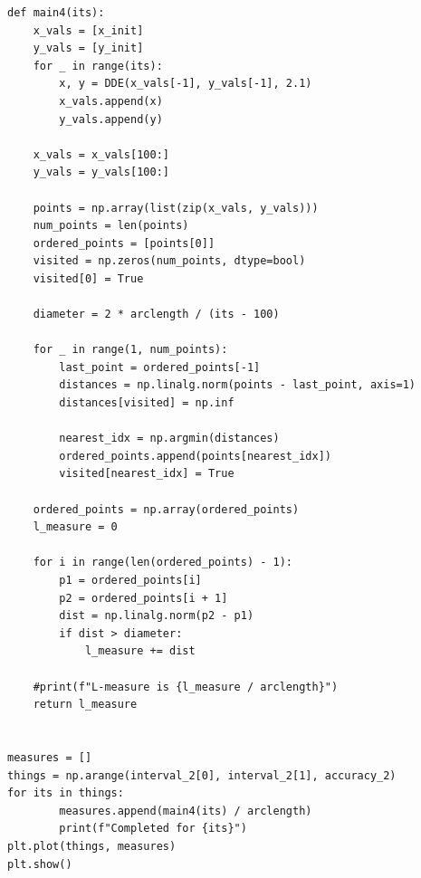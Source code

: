 \documentclass[11pt, letterpaper]{article}
\begin{document}
\begin{lstlisting}
def main4(its):
    x_vals = [x_init]
    y_vals = [y_init]
    for _ in range(its):
        x, y = DDE(x_vals[-1], y_vals[-1], 2.1)
        x_vals.append(x)
        y_vals.append(y)

    x_vals = x_vals[100:]
    y_vals = y_vals[100:]

    points = np.array(list(zip(x_vals, y_vals)))
    num_points = len(points)
    ordered_points = [points[0]]
    visited = np.zeros(num_points, dtype=bool)
    visited[0] = True

    diameter = 2 * arclength / (its - 100)

    for _ in range(1, num_points):
        last_point = ordered_points[-1]
        distances = np.linalg.norm(points - last_point, axis=1)
        distances[visited] = np.inf

        nearest_idx = np.argmin(distances)
        ordered_points.append(points[nearest_idx])
        visited[nearest_idx] = True

    ordered_points = np.array(ordered_points)
    l_measure = 0

    for i in range(len(ordered_points) - 1):
        p1 = ordered_points[i]
        p2 = ordered_points[i + 1]
        dist = np.linalg.norm(p2 - p1)
        if dist > diameter:
            l_measure += dist

    #print(f"L-measure is {l_measure / arclength}")
    return l_measure


measures = []
things = np.arange(interval_2[0], interval_2[1], accuracy_2)
for its in things:
        measures.append(main4(its) / arclength)
        print(f"Completed for {its}")
plt.plot(things, measures)
plt.show()
\end{lstlisting}


\end{document}
